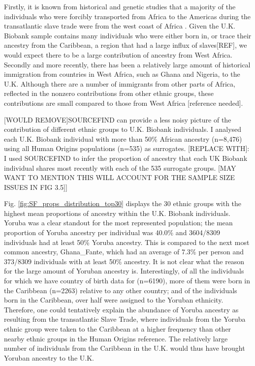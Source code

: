 Firstly, it is known from historical and genetic studies that a majority of the individuals who were forcibly transported from Africa to the Americas during the transatlantic slave trade were from the west coast of Africa \cite{micheletti2020genetic}. Given the U.K. Biobank sample contains many individuals who were either born in, or trace their ancestry from the Caribbean, {\color{red}a region that had a large influx of slaves[REF],} we would expect there to be a large contribution of ancestry from West Africa. Secondly and more recently, there has been a relatively large amount of historical immigration from countries in West Africa, such as Ghana and Nigeria, to the U.K. Although there are a number of immigrants from other parts of Africa, reflected in the nonzero contributions from other ethnic groups, these contributions are small compared to those from West Africa [reference needed].

{\color{red}[WOULD REMOVE]SOURCEFIND can provide a less noisy picture of the contribution of different ethnic groups to U.K. Biobank individuals. I analysed each U.K. Biobank individual with more than 50\% African ancestry (n=8,476) using all Human Origins populations (n=535) as surrogates. [REPLACE WITH]: I used SOURCEFIND to infer the proportion of ancestry that each UK Biobank individual shares most recently with each of the 535 surrogate groups. [MAY WANT TO MENTION THIS WILL ACCOUNT FOR THE SAMPLE SIZE ISSUES IN FIG 3.5]]}

Fig. \ref{fig:SF_props_distribution_top30} displays the 30 ethnic groups with the highest mean proportions of ancestry within the U.K. Biobank individuals. Yoruba was a clear standout for the most represented population; the mean proportion of Yoruba ancestry per individual was 40.0\% and 3604/8309 individuals had at least 50\% Yoruba ancestry. This is compared to the next most common ancestry, Ghana\_Fante, which had an average of 7.3\% per person and 373/8309 individuals with at least 50\% ancestry. It is not clear what the reason for the large amount of Yoruban ancestry is. Interestingly, of all the individuals for which we have country of birth data for (n=6190), more of them were born in the Caribbean (n=2263) relative to any other country; and of the individuals born in the Caribbean, over half were assigned to the Yoruban ethnicity. Therefore, one could tentatively explain the abundance of Yoruba ancestry as resulting from the transatlantic Slave Trade, where individuals from the Yoruba ethnic group were taken to the Caribbean at a higher frequency than other nearby ethnic groups {\color{red}in the Human Origins reference}. The relatively large number of individuals from the Caribbean in the U.K. would thus have brought Yoruban ancestry to the U.K. 

